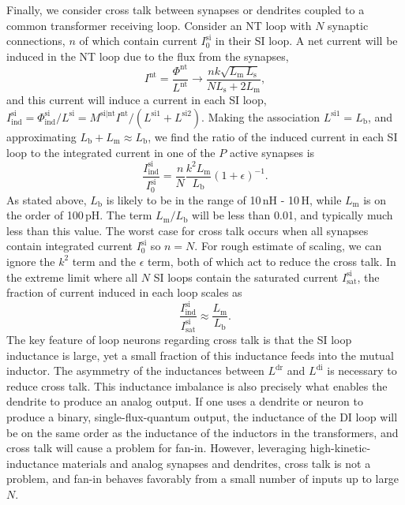 \documentclass[twocolumn]{article}
\begin{document}
Finally, we consider cross talk between synapses or dendrites coupled to a common transformer receiving loop. Consider an NT loop with $N$ synaptic connections, $n$ of which contain current $I^{\mathrm{si}}_0$ in their SI loop. A net current will be induced in the NT loop due to the flux from the synapses,
\begin{equation}
\label{eq:fan-in__transformer_collection__I_nt}
I^{\mathrm{nt}} = \frac{\Phi^{\mathrm{nt}}}{L^{\mathrm{nt}}}\rightarrow \frac{ n k \sqrt{L_{\mathrm{m}}\,L_{\mathrm{s}}}}{NL_{\mathrm{s}}+2L_{\mathrm{m}}},
\end{equation}
and this current will induce a current in each SI loop, $I^{\mathrm{si}}_{\mathrm{ind}} = \Phi^{\mathrm{si}}_{\mathrm{ind}}/L^{\mathrm{si}} = M^{\mathrm{si|nt}}I^{\mathrm{nt}}/(L^{\mathrm{si1}}+L^{\mathrm{si2}})$. Making the association $L^{\mathrm{si1}} = L_{\mathrm{b}}$, and approximating $L_{\mathrm{b}} + L_{\mathrm{m}} \approx L_{\mathrm{b}}$, we find the ratio of the induced current in each SI loop to the integrated current in one of the $P$ active synapses is
\begin{equation}
\label{eq:fan-in__transformer_collection__cross_talk}
\frac{I^{\mathrm{si}}_{\mathrm{ind}}}{I^{\mathrm{si}}_0} = \frac{n}{N}\frac{k^2L_{\mathrm{m}}}{L_{\mathrm{b}}}\left( 1+\epsilon \right)^{-1}.
\end{equation}
As stated above, $L_{\mathrm{b}}$ is likely to be in the range of 10\,nH - 10\,\textmu H, while $L_{\mathrm{m}}$ is on the order of 100\,pH. The term $L_{\mathrm{m}}/L_{\mathrm{b}}$ will be less than 0.01, and typically much less than this value. The worst case for cross talk occurs when all synapses contain integrated current $I^{\mathrm{si}}_0$ so $n = N$. For rough estimate of scaling, we can ignore the $k^2$ term and the $\epsilon$ term, both of which act to reduce the cross talk. In the extreme limit where all $N$ SI loops contain the saturated current $I^{\mathrm{si}}_{\mathrm{sat}}$, the fraction of current induced in each loop scales as
\begin{equation}
\label{eq:fan-in__transformer_collection__cross_talk__worst_case}
\frac{I^{\mathrm{si}}_{\mathrm{ind}}}{I^{\mathrm{si}}_{\mathrm{sat}}} \approx \frac{L_{\mathrm{m}}}{L_{\mathrm{b}}}.
\end{equation}
The key feature of loop neurons regarding cross talk is that the SI loop inductance is large, yet a small fraction of this inductance feeds into the mutual inductor. The asymmetry of the inductances between $L^{\mathrm{dr}}$ and $L^{\mathrm{di}}$ is necessary to reduce cross talk. This inductance imbalance is also precisely what enables the dendrite to produce an analog output. If one uses a dendrite or neuron to produce a binary, single-flux-quantum output, the inductance of the DI loop will be on the same order as the inductance of the inductors in the transformers, and cross talk will cause a problem for fan-in. However, leveraging high-kinetic-inductance materials and analog synapses and dendrites, cross talk is not a problem, and fan-in behaves favorably from a small number of inputs up to large $N$.



\end{document}
